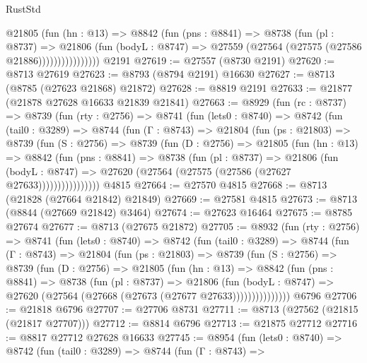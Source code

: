 \begin{lexlean}{RustStd}
\begin{coremodule}
                    @21805
                      (fun (hn : @13) =>
                      @8842
                        (fun (pns : @8841) =>
                        @8738
                          (fun (pl : @8737) =>
                          @21806
                            (fun (bodyL : @8747) =>
                            @27559 (@27564 (@27575 (@27586 @21886))))))))))))))))
    @2191
@27619 := @27557 (@8730 @2191)
@27620 := @8713 @27619
@27623 := @8793 (@8794 @2191) @16630
@27627 := @8713 (@8785 (@27623 @21868) @21872)
@27628 := @8819 @2191
@27633 := @21877 (@21878 @27628 @16633 @21839 @21841)
@27663 := @8929
    (fun (rc : @8737) =>
    @8739
      (fun (rty : @2756) =>
      @8741
        (fun (lets0 : @8740) =>
        @8742
          (fun (tail0 : @3289) =>
          @8744
            (fun (Γ : @8743) =>
            @21804
              (fun (ps : @21803) =>
              @8739
                (fun (S : @2756) =>
                @8739
                  (fun (D : @2756) =>
                  @21805
                    (fun (hn : @13) =>
                    @8842
                      (fun (pns : @8841) =>
                      @8738
                        (fun (pl : @8737) =>
                        @21806
                          (fun (bodyL : @8747) =>
                          @27620 (@27564 (@27575 (@27586 (@27627 @27633))))))))))))))))
    @4815
@27664 := @27570 @4815
@27668 := @8713 (@21828 (@27664 @21842) @21849)
@27669 := @27581 @4815
@27673 := @8713 (@8844 (@27669 @21842) @3464)
@27674 := @27623 @16464
@27675 := @8785 @27674
@27677 := @8713 (@27675 @21872)
@27705 := @8932
    (fun (rty : @2756) =>
    @8741
      (fun (lets0 : @8740) =>
      @8742
        (fun (tail0 : @3289) =>
        @8744
          (fun (Γ : @8743) =>
          @21804
            (fun (ps : @21803) =>
            @8739
              (fun (S : @2756) =>
              @8739
                (fun (D : @2756) =>
                @21805
                  (fun (hn : @13) =>
                  @8842
                    (fun (pns : @8841) =>
                    @8738
                      (fun (pl : @8737) =>
                      @21806
                        (fun (bodyL : @8747) =>
                        @27620 (@27564 (@27668 (@27673 (@27677 @27633)))))))))))))))
    @6796
@27706 := @21818 @6796
@27707 := @27706 @8731
@27711 := @8713 (@27562 (@21815 (@21817 @27707)))
@27712 := @8814 @6796
@27713 := @21875 @27712
@27716 := @8817 @27712 @27628 @16633
@27745 := @8954
    (fun (lets0 : @8740) =>
    @8742
      (fun (tail0 : @3289) =>
      @8744
        (fun (Γ : @8743) =>

\end{coremodule}
\end{lexlean}
